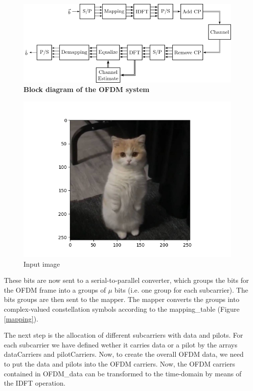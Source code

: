 \begin{figure}[htbp]
    \centering
    \includegraphics[width=\textwidth]{Figures/Block-diagram-2.png}
    \caption{\bfseries\centering\fontsize{13pt}{0pt}\selectfont Block diagram of the OFDM system}
    \label{Block diagram 2}    
\end{figure}

\begin{figure}[htbp]
    \centering
    \includegraphics[width=\textwidth]{../Source/results/input.png}
    \caption{Input image}
    \label{input}
\end{figure}

These bits are now sent to a serial-to-parallel converter, which groups the bits for the OFDM frame into a groups of $\mu$ bits (i.e. one group for each subcarrier). The bits groups are then sent to the mapper. The mapper converts the groups into complex-valued constellation symbols according to the mapping\_table (Figure \ref{mapping}).

The next step is the allocation of different subcarriers with data and pilots. For each subcarrier we have defined wether it carries data or a pilot by the arrays dataCarriers and pilotCarriers. Now, to create the overall OFDM data, we need to put the data and pilots into the OFDM carriers. Now, the OFDM carriers contained in OFDM\_data can be transformed to the time-domain by means of the IDFT operation.

